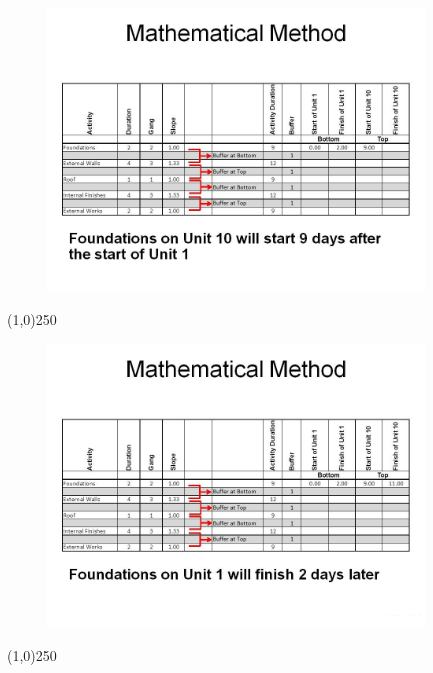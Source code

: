 \begin{frame}
\begin{figure}
	\centering
		\includegraphics[width = 10.0cm]{oldnotes/Slide283.jpg}
\end{figure}
\end{frame}
\begin{center}\line(1,0){250}\end{center}






\begin{frame}
\begin{figure}
	\centering
		\includegraphics[width = 10.0cm]{oldnotes/Slide284.jpg}
\end{figure}
\end{frame}
\begin{center}\line(1,0){250}\end{center}






